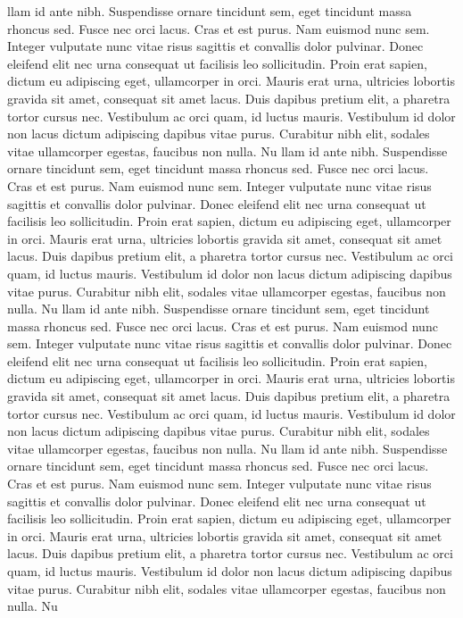 \documentclass[10pt]{article}
\begin{document}
\begin{multicols*}{2}
llam id ante nibh. Suspendisse ornare tincidunt sem, eget tincidunt massa rhoncus sed. Fusce nec orci lacus. Cras et est purus.
Nam euismod nunc sem. Integer vulputate nunc vitae risus sagittis et convallis dolor pulvinar. Donec eleifend elit nec urna consequat ut facilisis leo sollicitudin. Proin erat sapien, dictum eu adipiscing eget, ullamcorper in orci. Mauris erat urna, ultricies lobortis gravida sit amet, consequat sit amet lacus. Duis dapibus pretium elit, a pharetra tortor cursus nec. Vestibulum ac orci quam, id luctus mauris. Vestibulum id dolor non lacus dictum adipiscing dapibus vitae purus. Curabitur nibh elit, sodales vitae ullamcorper egestas, faucibus non nulla. Nu
llam id ante nibh. Suspendisse ornare tincidunt sem, eget tincidunt massa rhoncus sed. Fusce nec orci lacus. Cras et est purus.
Nam euismod nunc sem. Integer vulputate nunc vitae risus sagittis et convallis dolor pulvinar. Donec eleifend elit nec urna consequat ut facilisis leo sollicitudin. Proin erat sapien, dictum eu adipiscing eget, ullamcorper in orci. Mauris erat urna, ultricies lobortis gravida sit amet, consequat sit amet lacus. Duis dapibus pretium elit, a pharetra tortor cursus nec. Vestibulum ac orci quam, id luctus mauris. Vestibulum id dolor non lacus dictum adipiscing dapibus vitae purus. Curabitur nibh elit, sodales vitae ullamcorper egestas, faucibus non nulla. Nu
llam id ante nibh. Suspendisse ornare tincidunt sem, eget tincidunt massa rhoncus sed. Fusce nec orci lacus. Cras et est purus.
Nam euismod nunc sem. Integer vulputate nunc vitae risus sagittis et convallis dolor pulvinar. Donec eleifend elit nec urna consequat ut facilisis leo sollicitudin. Proin erat sapien, dictum eu adipiscing eget, ullamcorper in orci. Mauris erat urna, ultricies lobortis gravida sit amet, consequat sit amet lacus. Duis dapibus pretium elit, a pharetra tortor cursus nec. Vestibulum ac orci quam, id luctus mauris. Vestibulum id dolor non lacus dictum adipiscing dapibus vitae purus. Curabitur nibh elit, sodales vitae ullamcorper egestas, faucibus non nulla. Nu
llam id ante nibh. Suspendisse ornare tincidunt sem, eget tincidunt massa rhoncus sed. Fusce nec orci lacus. Cras et est purus.
Nam euismod nunc sem. Integer vulputate nunc vitae risus sagittis et convallis dolor pulvinar. Donec eleifend elit nec urna consequat ut facilisis leo sollicitudin. Proin erat sapien, dictum eu adipiscing eget, ullamcorper in orci. Mauris erat urna, ultricies lobortis gravida sit amet, consequat sit amet lacus. Duis dapibus pretium elit, a pharetra tortor cursus nec. Vestibulum ac orci quam, id luctus mauris. Vestibulum id dolor non lacus dictum adipiscing dapibus vitae purus. Curabitur nibh elit, sodales vitae ullamcorper egestas, faucibus non nulla. Nu

\end{multicols*}
\end{document}
